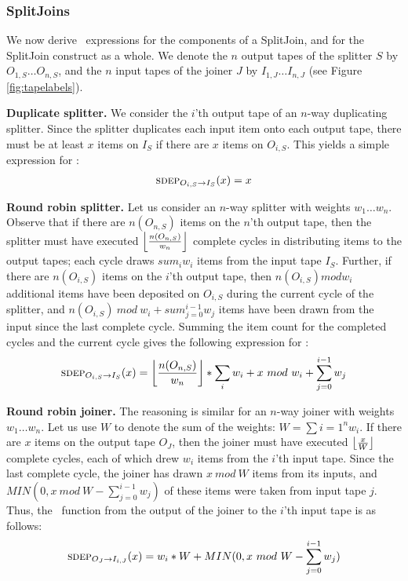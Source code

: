 \subsubsection{SplitJoins}
\label{sec:timesj}

We now derive \sdep~expressions for the components of a SplitJoin, and
for the SplitJoin construct as a whole.  We denote the $n$ output
tapes of the splitter $S$ by $O_{1,S} \dots O_{n,S}$, and the $n$
input tapes of the joiner $J$ by $I_{1,J} \dots I_{n,J}$ (see Figure
\ref{fig:tapelabels}).

{\bf Duplicate splitter.}  We consider the $i$'th output tape of an
$n$-way duplicating splitter.  Since the splitter duplicates each
input item onto each output tape, there must be at least $x$ items on
$I_S$ if there are $x$ items on $O_{i,S}$.  This yields a simple
expression for \sdep:
\begin{align*}
\mi{I_S}{O_{i,S}}(x) = x
\end{align*}

{\bf Round robin splitter.}  Let us consider an $n$-way
splitter with weights $w_1 \dots w_n$.  Observe that if there are
$n(O_{n,S})$ items on the $n$'th output tape, then the splitter must have
executed $\left\lfloor\frac{n(O_{n,S})}{w_n}\right\rfloor$ complete cycles in distributing items
to the output tapes; each cycle draws $sum_{i}{w_i}$ items from the
input tape $I_S$.  Further, if there are $n(O_{i,S})$ items on the $i$'th
output tape, then $n(O_{i,S}) mod w_i$ additional items have been
deposited on $O_{i,S}$ during the current cycle of the splitter, and
$n(O_{i,S})~mod~w_i + sum_{j=0}^{i-1}{w_j}$ items have been drawn from
the input since the last complete cycle.  Summing the item count for
the completed cycles and the current cycle gives the following
expression for \sdep:
\begin{align*}
\mi{I_S}{O_{i,S}}(x) = \floor{n(O_{n,S})}{w_n} * \sum_{i}{w_i} + x~mod~w_i +
\sum_{j=0}^{i-1}{w_j}
\end{align*}

{\bf Round robin joiner.}  The reasoning is similar for an
$n$-way joiner with weights $w_1 \dots w_n$.  Let us use $W$ to denote
the sum of the weights: $W = \sum{i=1}^{n}{w_i}$.  If there are $x$
items on the output tape $O_J$, then the joiner must have executed
$\left\lfloor\frac{x}{W}\right\rfloor$ complete cycles, each of which drew $w_i$ items from
the $i$'th input tape.  Since the last complete cycle, the joiner has
drawn $x~mod~W$ items from its inputs, and $MIN(0, x~mod~W -
\sum_{j=0}^{i-1}{w_j})$ of these items were taken from input tape $j$.
Thus, the \sdep~function from the output of the joiner to the $i$'th
input tape is as follows:
\begin{align*}
\mi{I_{i,J}}{O_J}(x) = w_i * W + MIN(0, x~mod~W - \sum_{j=0}^{i-1}{w_j})
\end{align*}

